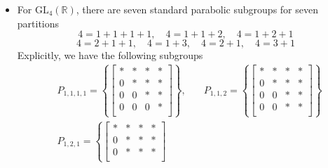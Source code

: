 \begin{example}
\begin{itemize}
        \item For  $\text{GL}_4(\mathbb{R})$, there are seven standard parabolic subgroups for seven partitions
              \[ 4 = 1+ 1+1+1, \quad 4 =1+1+2, \quad 4 = 1+2+1\]
              \[4 =2+1+1, \quad 4 = 1+3, \quad 4 = 2+1, \quad 4 = 3+1\]
              Explicitly, we have the following subgroups
              \begin{align*}
                   & P_{1,1,1,1} = \left\lbrace \begin{bmatrix}
                                                    \ast & \ast & \ast & \ast \\
                                                    0    & \ast & \ast & \ast \\
                                                    0    & 0    & \ast & \ast \\
                                                    0    & 0    & 0    & \ast \\
                                                \end{bmatrix} \right\rbrace, \quad & P_{1,1,2} = \left\lbrace \begin{bmatrix}
                                                                                                                  \ast & \ast & \ast & \ast \\
                                                                                                                  0    & \ast & \ast & \ast \\
                                                                                                                  0    & 0    & \ast & \ast \\
                                                                                                                  0    & 0    & \ast & \ast \\
                                                                                                              \end{bmatrix} \right\rbrace \\
                   & P_{1,2,1} = \left\lbrace \begin{bmatrix}
                                                  \ast & \ast & \ast & \ast \\
                                                  0    & \ast & \ast & \ast \\
                                                  0    & \ast & \ast & \ast \\

\end{bmatrix}
\end{align*}
\end{itemize}
\end{example}
